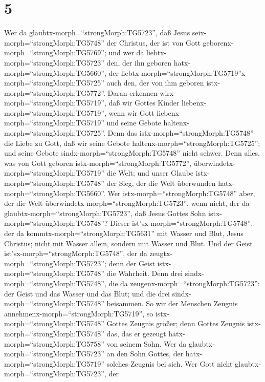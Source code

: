 \hypertarget{section-4}{%
\section{5}\label{section-4}}

 Wer da glaubtx-morph=``strongMorph:TG5723'', daß Jesus
seix-morph=``strongMorph:TG5748'' der Christus, der ist von Gott
geborenx-morph=``strongMorph:TG5769''; und wer da
liebtx-morph=``strongMorph:TG5723'' den, der ihn geboren
hatx-morph=``strongMorph:TG5660'', der
liebtx-morph=``strongMorph:TG5719''\textbar x-morph=``strongMorph:TG5725''
auch den, der von ihm geboren istx-morph=``strongMorph:TG5772''.
 Daran erkennen wirx-morph=``strongMorph:TG5719'', daß wir
Gottes Kinder liebenx-morph=``strongMorph:TG5719'', wenn wir Gott
liebenx-morph=``strongMorph:TG5719'' und seine Gebote
haltenx-morph=``strongMorph:TG5725''.  Denn das
istx-morph=``strongMorph:TG5748'' die Liebe zu Gott, daß wir seine
Gebote haltenx-morph=``strongMorph:TG5725''; und seine Gebote
sindx-morph=``strongMorph:TG5748'' nicht schwer.  Denn
alles, was von Gott geboren istx-morph=``strongMorph:TG5772'',
überwindetx-morph=``strongMorph:TG5719'' die Welt; und unser Glaube
istx-morph=``strongMorph:TG5748'' der Sieg, der die Welt überwunden
hatx-morph=``strongMorph:TG5660''.  Wer
istx-morph=``strongMorph:TG5748'' aber, der die Welt
überwindetx-morph=``strongMorph:TG5723'', wenn nicht, der da
glaubtx-morph=``strongMorph:TG5723'', daß Jesus Gottes Sohn
istx-morph=``strongMorph:TG5748''?  Dieser
ist'sx-morph=``strongMorph:TG5748'', der da
kommtx-morph=``strongMorph:TG5631'' mit Wasser und Blut, Jesus Christus;
nicht mit Wasser allein, sondern mit Wasser und Blut. Und der Geist
ist'sx-morph=``strongMorph:TG5748'', der da
zeugtx-morph=``strongMorph:TG5723''; denn der Geist
istx-morph=``strongMorph:TG5748'' die Wahrheit.  Denn drei
sindx-morph=``strongMorph:TG5748'', die da
zeugenx-morph=``strongMorph:TG5723'': der Geist und das Wasser und das
Blut;  und die drei sindx-morph=``strongMorph:TG5748''
beisammen.  So wir der Menschen Zeugnis
annehmenx-morph=``strongMorph:TG5719'', so
istx-morph=``strongMorph:TG5748'' Gottes Zeugnis größer; denn Gottes
Zeugnis istx-morph=``strongMorph:TG5748'' das, das er gezeugt
hatx-morph=``strongMorph:TG5758'' von seinem Sohn.  Wer da
glaubtx-morph=``strongMorph:TG5723'' an den Sohn Gottes, der
hatx-morph=``strongMorph:TG5719'' solches Zeugnis bei sich. Wer Gott
nicht glaubtx-morph=``strongMorph:TG5723'', der
